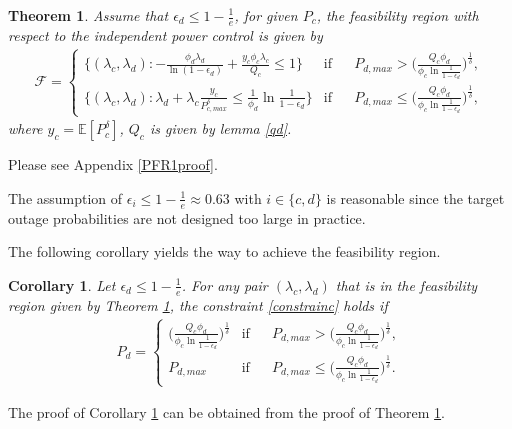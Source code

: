 \documentclass[12pt, draftclsnofoot, journal, letterpaper, onecolumn]{IEEEtran}
\newtheorem{corollary}{Corollary}[section]
\newtheorem{theorem}{Theorem}[section]
\begin{document}
\begin{theorem}\label{PFR1t}
Assume that $\epsilon_d\leq1-\frac{1}{e}$, for given $P_c$, the feasibility region with respect to the independent power control is given by
\begin{eqnarray*}
\mathcal F=
\begin{cases}
\big\{(\lambda_c,\lambda_d):-\frac{\phi_d\lambda_d}{\ln(1-\epsilon_d)}+\frac{y_c\phi_c\lambda_c}{Q_c}\leq1\big\} & \mbox{if} \phantom{aaa} P_{d,max}>\bigg(\frac{Q_c\phi_d}{\phi_c\ln\frac{1}{1-\epsilon_d}}\bigg)^{\frac{1}{\delta}},\\
\big\{(\lambda_c,\lambda_d):\lambda_d+\lambda_c\frac{y_c}{P_{c,max}^\delta}\leq\frac{1}{\phi_d}\ln\frac{1}{1-\epsilon_d}\big\} & \mbox{if}\phantom{aaa} P_{d,max}\leq\bigg(\frac{Q_c\phi_d}{\phi_c\ln\frac{1}{1-\epsilon_d}}\bigg)^{\frac{1}{\delta}},
\end{cases}
\end{eqnarray*}
where $y_c=\mathbb{E}[P_c^\delta]$, $Q_c$ is given by lemma \ref{qd}.
\end{theorem}

\begin{IEEEproof}
  Please see Appendix \ref{PFR1proof}.
\end{IEEEproof}
The assumption of $\epsilon_i\leq1-\frac{1}{e}\approx0.63$ with $i\in\{c,d\}$ is reasonable since the target outage probabilities are not designed too large in practice.

The following corollary yields the way to achieve the feasibility region.
\begin{corollary}\label{PFR1tC}
Let $\epsilon_d\leq1-\frac{1}{e}$. For any pair $(\lambda_c,\lambda_d)$ that is in the feasibility region given by Theorem \ref{PFR1t}, the constraint \eqref{constrainc} holds if
\begin{eqnarray}
P_d=
\begin{cases}
\bigg(\frac{Q_c\phi_d}{\phi_c\ln\frac{1}{1-\epsilon_d}}\bigg)^{\frac{1}{\delta}}& \mbox{if} \phantom{aaa} P_{d,max}>\bigg(\frac{Q_c\phi_d}{\phi_c\ln\frac{1}{1-\epsilon_d}}\bigg)^{\frac{1}{\delta}},\label{RPC11}\\
P_{d,max}& \mbox{if}\phantom{aaa} P_{d,max}\leq\bigg(\frac{Q_c\phi_d}{\phi_c\ln\frac{1}{1-\epsilon_d}}\bigg)^{\frac{1}{\delta}}.\label{RPC12}
\end{cases}
\end{eqnarray}
\end{corollary}
The proof of Corollary \ref{PFR1tC} can be obtained from the proof of Theorem \ref{PFR1t}.
\end{document}
